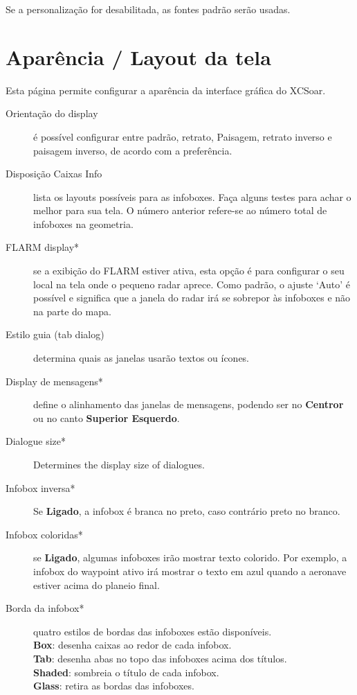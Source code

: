 Se a personalização for desabilitada, as fontes padrão serão usadas.


\section{Aparência / Layout da tela}\label{sec:interface-appearance}
\label{conf:interface-appearance}

Esta página permite configurar a aparência da interface gráfica do XCSoar.

\begin{description}
\item[Orientação do display] é possível configurar entre padrão, retrato, Paisagem, retrato inverso e paisagem inverso, de acordo com a preferência.
\item[Disposição Caixas Info]  lista os layouts possíveis para as infoboxes.  Faça alguns testes para achar o melhor para sua tela.  O número anterior refere-se ao número total de infoboxes na geometria.
\item[FLARM display*]  \label{conf:flarmradar-place}
 se a exibição do FLARM estiver ativa, esta opção é para configurar o seu local na tela onde o pequeno radar aprece.  Como padrão, o ajuste ‘Auto’ é possível e significa que a janela do radar irá se sobrepor às infoboxes e não na parte do mapa.
\item[Estilo guia (tab dialog)]  determina quais as janelas usarão textos ou ícones.
\item[Display de mensagens*]  define o alinhamento das janelas de mensagens, podendo ser no 
  {\bf Centror} ou no canto {\bf Superior Esquerdo}.
\item[Dialogue size*]  Determines the display size of dialogues.
\item[Infobox inversa*]  Se {\bf Ligado}, a infobox é branca no preto, caso contrário preto no branco.
\item[Infobox coloridas*]  se {\bf Ligado}, algumas infoboxes irão mostrar texto colorido.  Por exemplo, a infobox do waypoint ativo irá mostrar o texto em azul quando a aeronave estiver acima do planeio final.
\item[Borda da infobox*]  quatro estilos de bordas das infoboxes estão disponíveis. \\
  {\bf Box}: desenha caixas ao redor de cada infobox. \\
  {\bf Tab}: desenha abas no topo das infoboxes acima dos títulos. \\
  {\bf Shaded}: sombreia o título de cada infobox. \\
  {\bf Glass}: retira as bordas das infoboxes. \\
\end{description}



